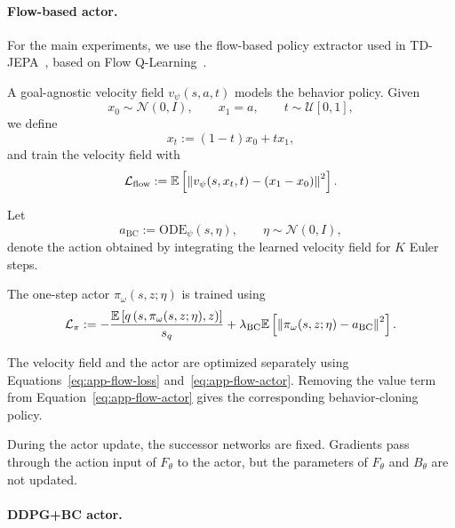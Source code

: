 \paragraph{Flow-based actor.}

For the main experiments, we use the flow-based policy extractor used in TD-JEPA~\citep{bagatella-iclr26a}, based on Flow Q-Learning~\citep{park-icml25a}.

A goal-agnostic velocity field $v_\psi(s,a,t)$ models the behavior policy.
Given
\begin{equation}
    x_0\sim\mathcal N(0,I), \qquad x_1=a, \qquad t\sim\mathcal U[0,1],
\end{equation}
we define
\begin{equation}
    x_t := (1-t)x_0+t x_1,
\end{equation}
and train the velocity field with
\begin{equation}
    \mathcal L_{\mathrm{flow}} := \mathbb{E} \left[ \left\| v_\psi(s,x_t,t) - (x_1-x_0) \right\|^2 \right]. \label{eq:app-flow-loss}
\end{equation}

Let
\begin{equation}
    a_{\mathrm{BC}} := \mathrm{ODE}_\psi(s,\eta), \qquad \eta\sim\mathcal N(0,I),
\end{equation}
denote the action obtained by integrating the learned velocity field for $K$ Euler steps.

The one-step actor $\pi_\omega(s,z;\eta)$ is trained using
\begin{equation}
    \mathcal L_{\pi} := - \frac{ \mathbb{E}\left[ q\left( s, \pi_\omega(s,z;\eta), z \right) \right] }{ s_q } + \lambda_{\mathrm{BC}} \mathbb{E} \left[ \left\| \pi_\omega(s,z;\eta) - a_{\mathrm{BC}} \right\|^2 \right]. \label{eq:app-flow-actor}
\end{equation}

The velocity field and the actor are optimized separately using Equations~\eqref{eq:app-flow-loss} and~\eqref{eq:app-flow-actor}.
Removing the value term from Equation~\eqref{eq:app-flow-actor} gives the corresponding behavior-cloning policy.

During the actor update, the successor networks are fixed.
Gradients pass through the action input of $F_\theta$ to the actor, but the parameters of $F_\theta$ and $B_\theta$ are not updated.


\paragraph{DDPG+BC actor.}

